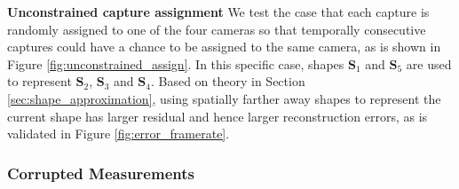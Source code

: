 \textbf{Unconstrained capture assignment}
We test the case that each capture is randomly assigned to one of the four cameras so that temporally consecutive captures could have a chance to be assigned to the same camera, as is shown in Figure \ref{fig:unconstrained_assign}. In this specific case, shapes $\mathbf{S}_1$ and $\mathbf{S}_5$ are used to represent $\mathbf{S}_2$, $\mathbf{S}_3$ and $\mathbf{S}_4$. Based on theory in Section \ref{sec:shape_approximation}, using spatially farther away shapes to represent the current shape has larger residual and hence larger reconstruction errors, as is validated in Figure \ref{fig:error_framerate}.
 
\subsubsection{Corrupted Measurements}

